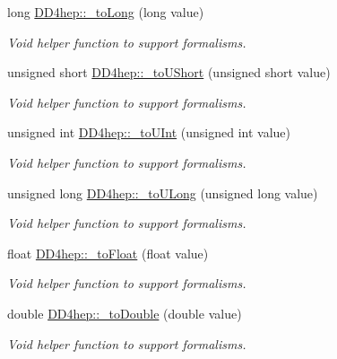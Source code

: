 \begin{DoxyCompactItemize}
long \hyperlink{group___d_d4_h_e_p___g_e_o_m_e_t_r_y_ga23a2ee3f07c47743d8a313babfb82841}{DD4hep::\_\-toLong} (long value)
\begin{DoxyCompactList}\small\item\em Void helper function to support formalisms. \item\end{DoxyCompactList}\item 
unsigned short \hyperlink{group___d_d4_h_e_p___g_e_o_m_e_t_r_y_gaff8a702098e20c2aa071703222b5a73e}{DD4hep::\_\-toUShort} (unsigned short value)
\begin{DoxyCompactList}\small\item\em Void helper function to support formalisms. \item\end{DoxyCompactList}\item 
unsigned int \hyperlink{group___d_d4_h_e_p___g_e_o_m_e_t_r_y_gab71d50eed88236ff6d21b5a29c7bba70}{DD4hep::\_\-toUInt} (unsigned int value)
\begin{DoxyCompactList}\small\item\em Void helper function to support formalisms. \item\end{DoxyCompactList}\item 
unsigned long \hyperlink{group___d_d4_h_e_p___g_e_o_m_e_t_r_y_gac59edb5f6a7d0fe5aa11255ef5b48bae}{DD4hep::\_\-toULong} (unsigned long value)
\begin{DoxyCompactList}\small\item\em Void helper function to support formalisms. \item\end{DoxyCompactList}\item 
float \hyperlink{group___d_d4_h_e_p___g_e_o_m_e_t_r_y_gaab1bf6ab129e49ea7ff106c361f73978}{DD4hep::\_\-toFloat} (float value)
\begin{DoxyCompactList}\small\item\em Void helper function to support formalisms. \item\end{DoxyCompactList}\item 
double \hyperlink{group___d_d4_h_e_p___g_e_o_m_e_t_r_y_ga3d960b4bfc48c6c6bce83e0021da377f}{DD4hep::\_\-toDouble} (double value)
\begin{DoxyCompactList}\small\item\em Void helper function to support formalisms. \item\end{DoxyCompactList}\item 

\end{DoxyCompactItemize}
